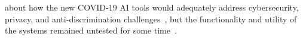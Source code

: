 \documentclass[acmconf,manuscript,screen,natbib=true]{acmart}
\begin{document}
about how the new COVID-19 AI tools would adequately address cybersecurity, privacy, and anti-discrimination challenges~\cite{krass2021us, digiwatch}, but the functionality and utility of the systems remained untested for some time~\cite{covidfail_summ, covidfail1, covidfail2, covidfail3}. 


\end{document}
